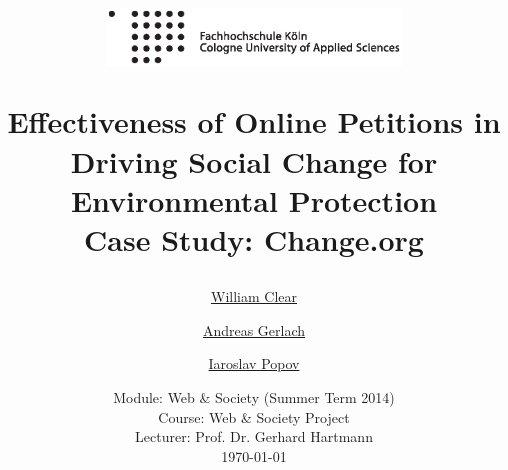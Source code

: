 \documentclass[a4paper]{article}
\begin{document}
	\title{
	\begin{figure}[!ht]
		\flushleft
			\includegraphics[width=0.7\textwidth]{assets/logo.eps}
	\end{figure}
	\vspace{1cm}
	\Huge Effectiveness of Online Petitions in Driving Social Change for Environmental Protection \\
    \large Case Study: Change.org
	}
	
	\vspace{1cm}
	
	
	\author{\Large \href{mailto:william.j.clear@gmail.com}{William Clear} \and \Large \href{mailto:andreas.gerlach@smail.fh-koeln.de}{Andreas Gerlach} \and \Large \href{mailto:iaroslav.popov@gmail.com}{Iaroslav Popov}
	\vspace{1cm}}
	
	\date{
	\large Module: Web \& Society (Summer Term 2014) \\ Course: Web \& Society Project \\ 
	\vspace{0.8cm}
	\large Lecturer: Prof. Dr. Gerhard Hartmann \\
	\vspace{1cm}
	\today
	}

	\maketitle
	\setlength{\parindent}{0pt}

\vspace{2cm}

% 







\end{document}
